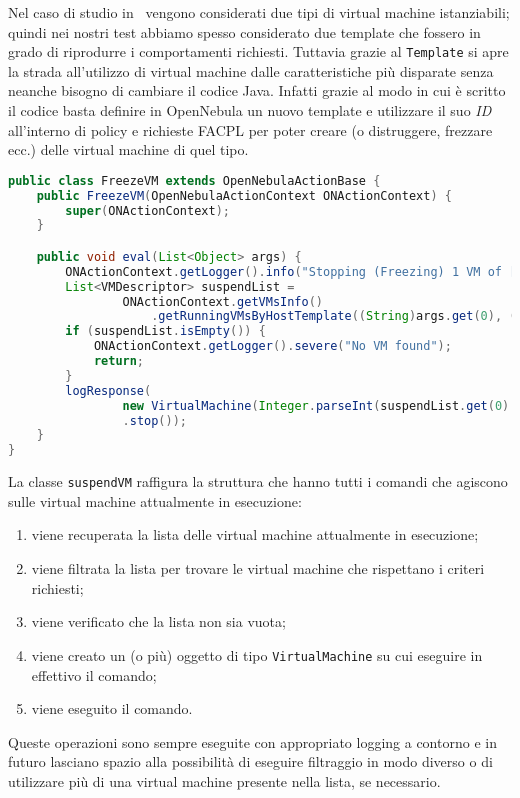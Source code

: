 Nel caso di studio in~\cite{10.1007/978-3-319-08260-8_6} vengono considerati due tipi di virtual machine istanziabili; quindi nei nostri test abbiamo spesso considerato due template che fossero in grado di riprodurre i comportamenti richiesti. Tuttavia grazie al \texttt{Template} si apre la strada all'utilizzo di virtual machine dalle caratteristiche più disparate senza neanche bisogno di cambiare il codice Java. Infatti grazie al modo in cui è scritto il codice basta definire in OpenNebula un nuovo template e utilizzare il suo \emph{ID} all'interno di policy e richieste FACPL per poter creare (o distruggere, frezzare ecc.) delle virtual machine di quel tipo.
\begin{lstlisting}[language=Java, caption=Classe per freezzare(sospendere) una \texttt{VirtualMachine}, label=code:FreezeVM, basicstyle=\fontsize{8.5}{9.5}\ttfamily]
public class FreezeVM extends OpenNebulaActionBase {
    public FreezeVM(OpenNebulaActionContext ONActionContext) {
        super(ONActionContext);
    }

    public void eval(List<Object> args) {
        ONActionContext.getLogger().info("Stopping (Freezing) 1 VM of [host, template]: " + "[" + args.get(0) + " " + args.get(2) + "]");
        List<VMDescriptor> suspendList = 
                ONActionContext.getVMsInfo()
                    .getRunningVMsByHostTemplate((String)args.get(0), (String)args.get(2));
        if (suspendList.isEmpty()) {
            ONActionContext.getLogger().severe("No VM found");
            return;
        }
        logResponse(
                new VirtualMachine(Integer.parseInt(suspendList.get(0).getVmId()), ONActionContext.getClient())
                .stop());
    }
}
\end{lstlisting}
La classe \texttt{suspendVM} raffigura la struttura che hanno tutti i comandi che agiscono sulle virtual machine attualmente in esecuzione:
\begin{enumerate}
    \item viene recuperata la lista delle virtual machine attualmente in esecuzione;
    \item viene filtrata la lista per trovare le virtual machine che rispettano i criteri richiesti;
    \item viene verificato che la lista non sia vuota;
    \item viene creato un (o più) oggetto di tipo \texttt{VirtualMachine} su cui eseguire in effettivo il comando;
    \item viene eseguito il comando.
\end{enumerate}
Queste operazioni sono sempre eseguite con appropriato logging a contorno e in futuro lasciano spazio alla possibilità di eseguire filtraggio in modo diverso o di utilizzare più di una virtual machine presente nella lista, se necessario.

